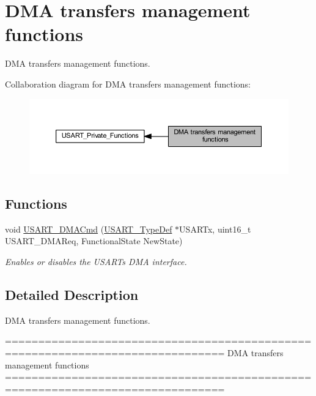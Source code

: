 \hypertarget{group___u_s_a_r_t___group8}{}\section{D\+MA transfers management functions}
\label{group___u_s_a_r_t___group8}


D\+MA transfers management functions.  


Collaboration diagram for D\+MA transfers management functions\+:\nopagebreak
\begin{figure}[H]
\begin{center}
\leavevmode
\includegraphics[width=350pt]{group___u_s_a_r_t___group8}
\end{center}
\end{figure}
\subsection*{Functions}
\begin{DoxyCompactItemize}
\item 
void \hyperlink{group___u_s_a_r_t___group8_ga902857f199ebfba21c63d725354af66f}{U\+S\+A\+R\+T\+\_\+\+D\+M\+A\+Cmd} (\hyperlink{struct_u_s_a_r_t___type_def}{U\+S\+A\+R\+T\+\_\+\+Type\+Def} $\ast$U\+S\+A\+R\+Tx, uint16\+\_\+t U\+S\+A\+R\+T\+\_\+\+D\+M\+A\+Req, Functional\+State New\+State)
\begin{DoxyCompactList}\small\item\em Enables or disables the U\+S\+A\+RT\textquotesingle{}s D\+MA interface. \end{DoxyCompactList}\end{DoxyCompactItemize}


\subsection{Detailed Description}
D\+MA transfers management functions. 

\begin{DoxyVerb} ===============================================================================
                      DMA transfers management functions
 ===============================================================================  \end{DoxyVerb}
 

